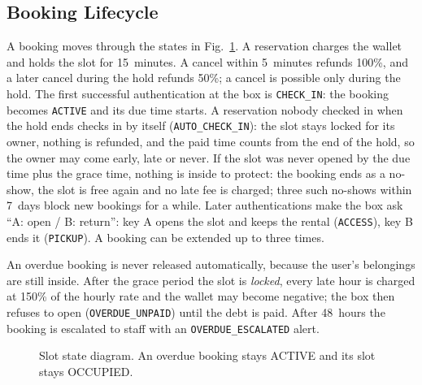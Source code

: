 \documentclass[conference, onecolumn]{IEEEtran}
\begin{document}
\subsection{Booking Lifecycle}

A booking moves through the states in Fig.~\ref{fig:state}. A reservation charges the wallet and holds the slot for
15~minutes. A cancel within 5~minutes refunds 100\%, and a later cancel during the hold refunds 50\%; a cancel is possible
only during the hold. The first successful authentication at the box is
\texttt{CHECK\_IN}: the booking becomes \texttt{ACTIVE} and its due time starts. A reservation nobody checked in
when the hold ends checks in by itself (\texttt{AUTO\_CHECK\_IN}): the slot stays locked for its owner, nothing is
refunded, and the paid time counts from the end of the hold, so the owner may come early, late or never. If the slot
was never opened by the due time plus the grace time, nothing is inside to protect: the booking ends as a no-show, the
slot is free again and no late fee is charged; three such no-shows within 7~days block new bookings for a while. Later authentications make the box ask
``A: open / B: return'': key A opens the slot and keeps the rental (\texttt{ACCESS}), key B ends it (\texttt{PICKUP}).
A booking can be extended up to three times.

An overdue booking is never released automatically, because the user's belongings are still inside. After the grace
period the slot is \emph{locked}, every late hour is charged at 150\% of the hourly rate and the wallet may become
negative; the box then refuses to open (\texttt{OVERDUE\_UNPAID}) until the debt is paid. After 48~hours the booking is
escalated to staff with an \texttt{OVERDUE\_ESCALATED} alert.

\begin{figure}[H]
\centering
{}
\caption{Slot state diagram. An overdue booking stays ACTIVE and its slot stays OCCUPIED.}
\label{fig:state}
\end{figure}
\end{document}
